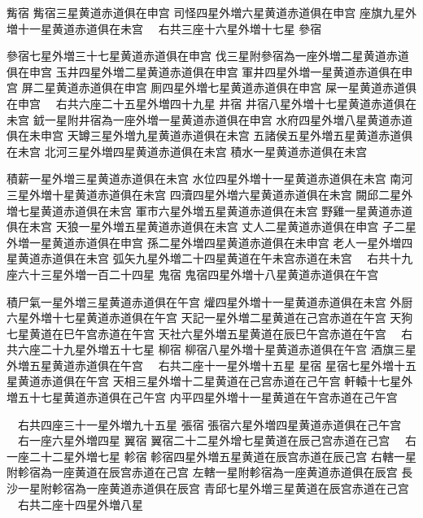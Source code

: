 \begin{正文}
觜宿
觜宿三星黄道赤道俱在申宫
司怪四星外増六星黄道赤道俱在申宫
座旗九星外増十一星黄道赤道俱在未宫
　右共三座十六星外増十七星
參宿
\par
參宿七星外増三十七星黄道赤道俱在申宫
伐三星附參宿為一座外増二星黄道赤道俱在申宫
玉井四星外増二星黄道赤道俱在申宫
軍井四星外増一星黄道赤道俱在申宫
屏二星黄道赤道俱在申宫
厠四星外増七星黄道赤道俱在申宫
屎一星黄道赤道俱在申宫
　右共六座二十五星外増四十九星
井宿
井宿八星外増十七星黄道赤道俱在未宫
龯一星附井宿為一座外増一星黄道赤道俱在申宫
水府四星外増八星黄道赤道俱在未申宫
天罇三星外増九星黄道赤道俱在未宫
五諸侯五星外増五星黄道赤道俱在未宫
北河三星外増四星黄道赤道俱在未宫
積水一星黄道赤道俱在未宫
\par
積薪一星外増三星黄道赤道俱在未宫
水位四星外増十一星黄道赤道俱在未宫
南河三星外増十星黄道赤道俱在未宫
四瀆四星外増六星黄道赤道俱在未宫
闕邱二星外増七星黄道赤道俱在未宫
軍市六星外増五星黄道赤道俱在未宫
野雞一星黄道赤道俱在未宫
天狼一星外増五星黄道赤道俱在未宫
丈人二星黄道赤道俱在申宫
子二星外増一星黄道赤道俱在申宫
孫二星外増四星黄道赤道俱在未申宫
老人一星外増四星黄道赤道俱在未宫
弧矢九星外増二十四星黄道在午未宫赤道在未宫
　右共十九座六十三星外増一百二十四星
鬼宿
鬼宿四星外増十八星黄道赤道俱在午宫
\par
積尸氣一星外増三星黄道赤道俱在午宫
爟四星外増十一星黄道赤道俱在未宫
外厨六星外増十七星黄道赤道俱在午宫
天記一星外増二星黄道在己宫赤道在午宫
天狗七星黄道在巳午宫赤道在午宫
天社六星外増五星黄道在辰巳午宫赤道在午宫
　右共六座二十九星外増五十七星
柳宿
柳宿八星外増十星黄道赤道俱在午宫
酒旗三星外増五星黄道赤道俱在午宫
　右共二座十一星外増十五星
星宿
星宿七星外増十五星黄道赤道俱在午宫
天相三星外増十二星黄道在己宫赤道在己午宫
軒轅十七星外増五十七星黄道赤道俱在己午宫
内平四星外増十一星黄道在午宫赤道在己午宫
\par
　右共四座三十一星外増九十五星
張宿
張宿六星外増四星黄道赤道俱在己午宫
　右一座六星外増四星
翼宿
翼宿二十二星外增七星黄道在辰己宫赤道在己宫
　右一座二十二星外増七星
軫宿
軫宿四星外増五星黄道在辰宫赤道在辰己宫
右轄一星附軫宿為一座黄道在辰宫赤道在己宫
左轄一星附軫宿為一座黄道赤道俱在辰宫
長沙一星附軫宿為一座黄道赤道俱在辰宫
青邱七星外増三星黄道在辰宫赤道在己宫
　右共二座十四星外増八星

\end{正文}
